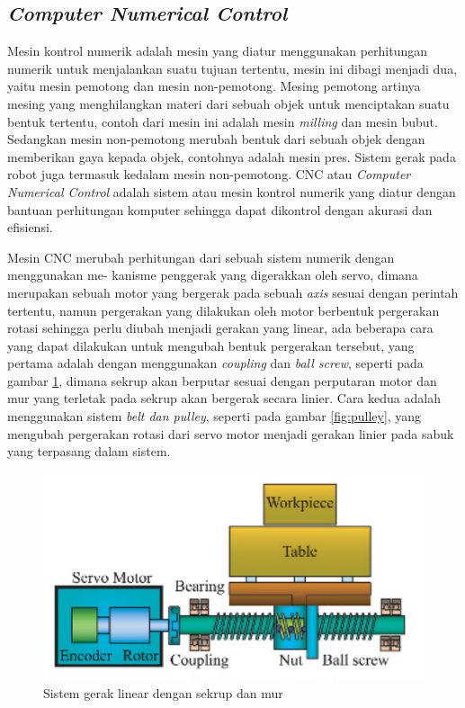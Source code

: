 \subsection{\textit{Computer Numerical Control}}
Mesin kontrol numerik adalah mesin yang diatur menggunakan perhitungan numerik untuk menjalankan suatu tujuan tertentu, mesin ini dibagi menjadi dua, yaitu mesin pemotong dan mesin non-pemotong. Mesing pemotong artinya mesing yang menghilangkan materi dari sebuah objek untuk menciptakan suatu bentuk tertentu, contoh dari mesin ini adalah mesin \textit{milling} dan mesin bubut. Sedangkan mesin non-pemotong merubah bentuk dari sebuah objek dengan memberikan gaya kepada objek, contohnya adalah mesin pres. Sistem gerak pada robot juga termasuk kedalam mesin non-pemotong. CNC atau \textit{Computer Numerical Control} adalah sistem atau mesin kontrol numerik yang diatur dengan bantuan perhitungan komputer sehingga dapat dikontrol dengan akurasi dan efisiensi. 

Mesin CNC merubah perhitungan dari sebuah sistem numerik dengan menggunakan me- kanisme penggerak yang digerakkan oleh servo, dimana merupakan sebuah motor yang bergerak pada sebuah \textit{axis} sesuai dengan perintah tertentu, namun pergerakan yang dilakukan oleh motor berbentuk pergerakan rotasi sehingga perlu diubah menjadi gerakan yang linear, ada beberapa cara yang dapat dilakukan untuk mengubah bentuk pergerakan tersebut, yang pertama adalah dengan menggunakan \textit{coupling} dan \textit{ball screw}, seperti pada gambar \ref{fig:nut-screw}, dimana sekrup akan berputar sesuai dengan perputaran motor dan mur yang terletak pada sekrup akan bergerak secara linier. Cara kedua adalah menggunakan sistem \textit{belt dan pulley}, seperti pada gambar \ref{fig:pulley}, yang mengubah pergerakan rotasi dari servo motor menjadi gerakan linier pada sabuk yang terpasang dalam sistem. 

\begin{figure}[H]
    \centering
    \includegraphics[width=0.5\linewidth]{gambar/nut-screw-mech.png}
    \caption{Sistem gerak linear dengan sekrup dan mur}
    \label{fig:nut-screw}
\end{figure}

